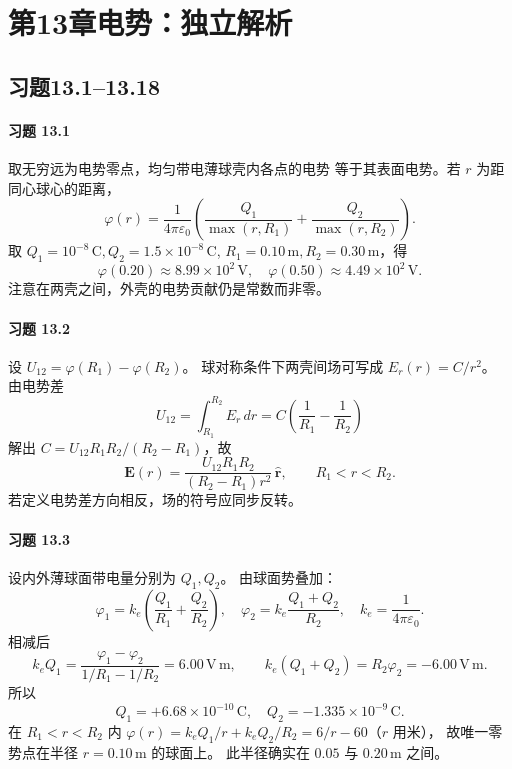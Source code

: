 \section*{第13章\quad 电势：独立解析}
\subsection*{习题13.1--13.18}

\paragraph{习题 13.1}
取无穷远为电势零点，均匀带电薄球壳内各点的电势
等于其表面电势。若 \(r\) 为距同心球心的距离，
\[
 \varphi(r)=\frac1{4\pi\varepsilon_0}
 \left(\frac{Q_1}{\max(r,R_1)}+
 \frac{Q_2}{\max(r,R_2)}\right).
\]
取 \(Q_1=10^{-8}\,\mathrm C,Q_2=1.5\times10^{-8}\,\mathrm C\),
\(R_1=0.10\,\mathrm m,R_2=0.30\,\mathrm m\)，得
\[
 \boxed{\varphi(0.20)\approx 8.99\times10^2\,\mathrm V},\quad
 \boxed{\varphi(0.50)\approx 4.49\times10^2\,\mathrm V}.
\]
注意在两壳之间，外壳的电势贡献仍是常数而非零。

\paragraph{习题 13.2}
设 \(U_{12}=\varphi(R_1)-\varphi(R_2)\)。
球对称条件下两壳间场可写成
\(E_r(r)=C/r^2\)。
由电势差
\[
 U_{12}=\int_{R_1}^{R_2}E_r\,dr
 =C\left(\frac1{R_1}-\frac1{R_2}\right)
\]
解出 \(C=U_{12}R_1R_2/(R_2-R_1)\)，故
\[
 \boxed{\boldsymbol E(r)=
 \frac{U_{12}R_1R_2}{(R_2-R_1)r^2}
 \,\hat{\boldsymbol r},\qquad R_1<r<R_2}.
\]
若定义电势差方向相反，场的符号应同步反转。

\paragraph{习题 13.3}
设内外薄球面带电量分别为 \(Q_1,Q_2\)。
由球面势叠加：
\[
 \varphi_1=k_e\left(\frac{Q_1}{R_1}+\frac{Q_2}{R_2}\right),
 \quad
 \varphi_2=k_e\frac{Q_1+Q_2}{R_2},
 \quad k_e=\frac1{4\pi\varepsilon_0}.
\]
相减后
\[
 k_eQ_1=\frac{\varphi_1-\varphi_2}{1/R_1-1/R_2}
 =6.00\,\mathrm{V\,m},
 \qquad k_e(Q_1+Q_2)=R_2\varphi_2=-6.00\,\mathrm{V\,m}.
\]
所以
\[
 \boxed{Q_1=+6.68\times10^{-10}\,\mathrm C,\quad
 Q_2=-1.335\times10^{-9}\,\mathrm C}.
\]
在 \(R_1<r<R_2\) 内
\(\varphi(r)=k_eQ_1/r+k_eQ_2/R_2=6/r-60\)（\(r\) 用米），
故唯一零势点在半径
\(\boxed{r=0.10\,\mathrm m}\) 的球面上。
此半径确实在 \(0.05\) 与 \(0.20\,\mathrm m\) 之间。

